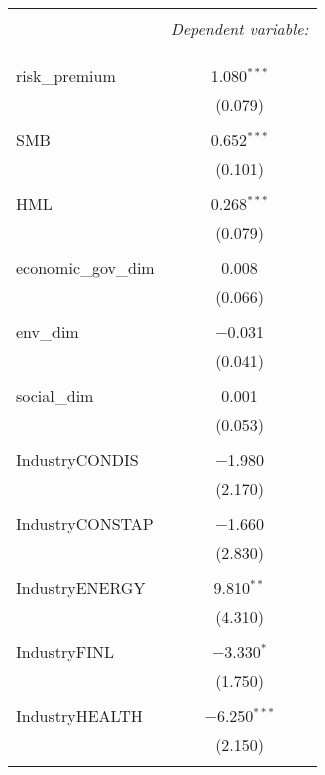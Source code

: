 
\begin{table}[!htbp] \centering 
  \caption{} 
  \label{} 
\begin{tabular}{@{\extracolsep{5pt}}lc} 
\\[-1.8ex]\hline 
\hline \\[-1.8ex] 
 & \multicolumn{1}{c}{\textit{Dependent variable:}} \\ 
\cline{2-2} 
\\[-1.8ex] &   \\ 
\hline \\[-1.8ex] 
 risk\_premium & 1.080$^{***}$ \\ 
  & (0.079) \\ 
  & \\ 
 SMB & 0.652$^{***}$ \\ 
  & (0.101) \\ 
  & \\ 
 HML & 0.268$^{***}$ \\ 
  & (0.079) \\ 
  & \\ 
 economic\_gov\_dim & 0.008 \\ 
  & (0.066) \\ 
  & \\ 
 env\_dim & $-$0.031 \\ 
  & (0.041) \\ 
  & \\ 
 social\_dim & 0.001 \\ 
  & (0.053) \\ 
  & \\ 
 IndustryCONDIS & $-$1.980 \\ 
  & (2.170) \\ 
  & \\ 
 IndustryCONSTAP & $-$1.660 \\ 
  & (2.830) \\ 
  & \\ 
 IndustryENERGY & 9.810$^{**}$ \\ 
  & (4.310) \\ 
  & \\ 
 IndustryFINL & $-$3.330$^{*}$ \\ 
  & (1.750) \\ 
  & \\ 
 IndustryHEALTH & $-$6.250$^{***}$ \\ 
  & (2.150) \\ 
  & \\ 

\end{tabular}
\end{table}
